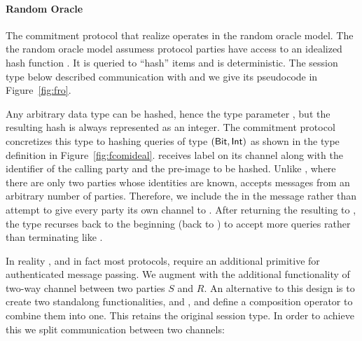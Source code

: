 %

\paragraph{Random Oracle}
The commitment protocol \protcom that realize \Fcom operates in the random oracle model. 
The the random oracle model assumess protocol parties have access to an idealized hash function \Fro.
It is queried to ``hash'' items and is deterministic. 
The session type below described communication with \Fro and we give its pseudocode in Figure~\ref{fig:fro}.


Any arbitrary data type can be hashed, hence the type parameter , but the resulting hash is always represented as an integer. 
The commitment protocol concretizes this type to hashing queries of type $\mathsf{(Bit,Int)}$ as shown in the type definition \protcom in Figure~\ref{fig:fcomideal}.
\Fro receives label  on its channel along with the identifier of the calling party and the pre-image to be hashed. 
Unlike \Fcom, where there are only two parties whose identities are known, \Fro accepts messages from an arbitrary number of parties.
Therefore, we include the  in the message rather than attempt to give every party its own channel to \Fro.
After returning the resulting  to , the type recurses back to the beginning (back to ) to accept more queries rather than terminating like \Fcom.

In reality \protcom, and in fact most protocols, require an additional primitive for authenticated message passing.
We augment \Fro with the additional functionality of two-way channel between two parties $S$ and $R$. 
An alternative to this design is to create two standalong functionalities, \Fro and \Fchan, and define a composition operator to combine them into one. 
This retains the original  session type. 
In order to achieve this we split communication between two channels:

